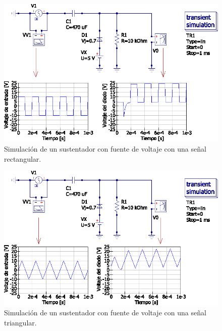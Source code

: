 \documentclass[letter,twoside,11pt]{article}
\begin{document}
\begin{figure}[!h]
\centering
\includegraphics[scale=0.97]{simulacion/practica1.11.eps}
\caption{Simulación de un sustentador con fuente de voltaje con una señal
rectangular.}
\label{simulacion11}
\end{figure}

\begin{figure}[!h]
\centering
\includegraphics[scale=0.97]{simulacion/practica1.12.eps}
\caption{Simulación de un sustentador con fuente de voltaje con una señal
triangular.}
\label{simulacion12}
\end{figure}
\end{document}
